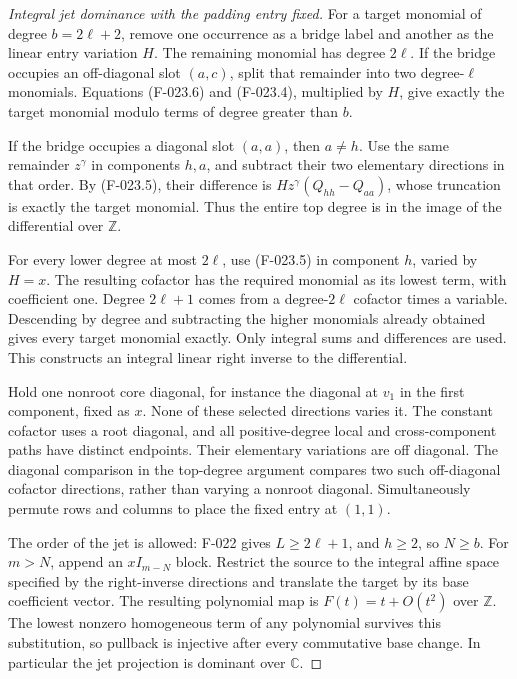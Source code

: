 \begin{proof}[Integral jet dominance with the padding entry fixed]
For a target monomial of degree \(b=2\ell+2\), remove
one occurrence as a bridge label and another as the linear
entry variation \(H\). The remaining monomial has degree
\(2\ell\). If the bridge occupies an off-diagonal slot
\((a,c)\), split that remainder into two degree-\(\ell\)
monomials. Equations (F-023.6) and (F-023.4), multiplied
by \(H\), give exactly the target monomial modulo terms
of degree greater than \(b\).

If the bridge occupies a diagonal slot \((a,a)\), then
\(a\ne h\). Use the same remainder \(z^\gamma\)
in components \(h,a\), and subtract their two elementary
directions in that order. By (F-023.5), their difference
is \(H z^\gamma(Q_{hh}-Q_{aa})\), whose truncation
is exactly the target monomial. Thus the entire top degree
is in the image of the differential over \(\mathbb Z\).

For every lower degree at most \(2\ell\), use
(F-023.5) in component \(h\), varied by \(H=x\).
The resulting cofactor has the required monomial as its
lowest term, with coefficient one. Degree \(2\ell+1\)
comes from a degree-\(2\ell\) cofactor times a variable.
Descending by degree and subtracting the higher monomials
already obtained gives every target monomial exactly.
Only integral sums and differences are used. This constructs
an integral linear right inverse to the differential.

Hold one nonroot core diagonal, for instance the diagonal
at \(v_1\) in the first component, fixed as \(x\).
None of these selected directions varies it. The constant
cofactor uses a root diagonal, and all positive-degree
local and cross-component paths have distinct endpoints.
Their elementary variations are off diagonal. The diagonal
comparison in the top-degree argument compares two such
off-diagonal cofactor directions, rather than varying a
nonroot diagonal. Simultaneously permute rows and columns
to place the fixed entry at \((1,1)\).

The order of the jet is allowed: F-022 gives
\(L\geq2\ell+1\), and \(h\geq2\), so \(N\geq b\).
For \(m>N\), append an \(xI_{m-N}\) block. Restrict
the source to the integral affine space specified by the
right-inverse directions and translate the target by its
base coefficient vector. The resulting polynomial map is
\(F(t)=t+O(t^2)\) over \(\mathbb Z\). The lowest
nonzero homogeneous term of any polynomial survives this
substitution, so pullback is injective after every commutative
base change. In particular the jet projection is dominant
over \(\mathbb C\).


\end{proof}
